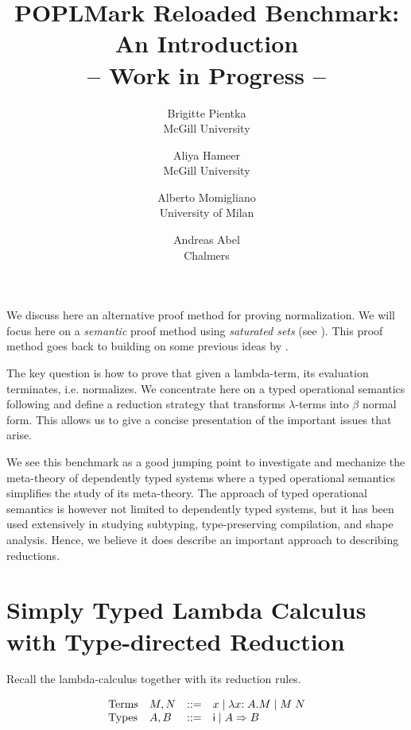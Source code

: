 \documentclass{article}
\begin{document}
\title{POPLMark Reloaded Benchmark: An Introduction \\
-- Work in Progress --}
\author{%
Brigitte Pientka \\ McGill University%
  \and Aliya Hameer \\ McGill University%
  \and Alberto Momigliano \\ University of Milan%
  \and Andreas Abel \\ Chalmers %
%
  }
\date{}
\maketitle

We discuss here an alternative proof method for proving
normalization. We will focus here on a \emph{semantic} proof method
using \emph{saturated sets} (see \cite{Luo:PHD90}). This proof method
goes back to \cite{Girard1972} building on some previous ideas
by \cite{Tait67}.

The key question is how to prove that given a lambda-term, its
evaluation terminates, i.e. normalizes. We concentrate here on a typed
operational semantics following \cite{Goguen:TLCA95} and define
a reduction strategy that transforms $\lambda$-terms into
$\beta$ normal form. This allows us to give a concise presentation of the important issues that arise.

 We see this benchmark as a good jumping point to investigate and mechanize the meta-theory of dependently typed systems where a typed operational semantics simplifies the study of its meta-theory. The approach of typed operational semantics is however not limited to dependently typed systems, but it has been used extensively in studying subtyping,  type-preserving compilation, and shape analysis. Hence, we believe it does describe an important approach to describing reductions.



\section*{Simply Typed Lambda Calculus with Type-directed Reduction}
Recall the lambda-calculus together with its reduction rules.


\[
\begin{array}{llcl}
\mbox{Terms}  & M,N & \mathrel{::=} & x \mid \lambda x{:A}. M \mid M\;N \\
\mbox{Types} & A, B & \mathrel{::=} & \textsf{i} \mid A \Rightarrow B
\end{array}
\]
\end{document}
